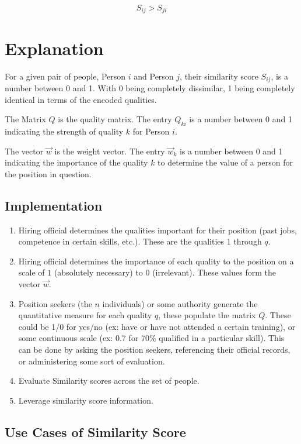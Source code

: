 \documentclass{article}
\begin{document}
\[S_{ij} > S_{ji}\]

\section{Explanation}

For a given pair of people, Person $i$ and Person $j$, their similarity score $S_{ij}$, is a number between 0 and 1. With 0 being completely dissimilar, 1 being completely identical in terms of the encoded qualities. 

The Matrix $Q$ is the quality matrix. The entry $Q_{ki}$ is a number between 0 and 1 indicating the strength of quality $k$ for Person $i$.

The vector $\vec{w}$ is the weight vector. The entry $\vec{w}_k$ is a number between 0 and 1 indicating the importance of the quality $k$ to determine the value of a person for the position in question.


\subsection{Implementation}

\begin{enumerate}
\item Hiring official determines the qualities important for their position (past jobs, competence in certain skills, etc.). These are the qualities 1 through $q$.
\item Hiring official determines the importance of each quality to the position on a scale of $1$ (absolutely necessary) to $0$ (irrelevant). These values form the vector $\vec{w}$.
\item Position seekers (the $n$ individuals) or some authority generate the quantitative measure for each quality $q$, these populate the matrix $Q$. These could be 1/0 for yes/no (ex: have or have not attended a certain training), or some continuous scale (ex: 0.7 for 70\% qualified in a particular skill). This can be done by asking the position seekers, referencing their official records, or administering some sort of evaluation.
\item Evaluate Similarity scores across the set of people.
\item Leverage similarity score information.
\end{enumerate}

\subsection{Use Cases of Similarity Score}
\end{document}
